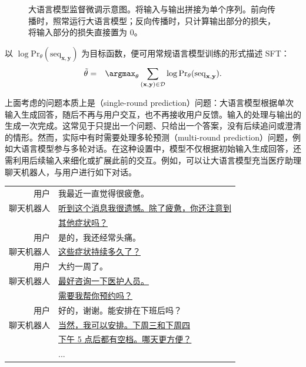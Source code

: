\begin{figure}[!t]
\centering

\caption{大语言模型监督微调示意图。将输入与输出拼接为单个序列。前向传播时，照常运行大语言模型；反向传播时，只计算输出部分的损失，将输入部分的损失直接置为 0。}
\label{fig:sft-forward-backward}
\end{figure}

以 $\log \mathrm{Pr}_{\theta}(\mathrm{seq}_{\mathbf{x},\mathbf{y}})$ 为目标函数，便可用常规语言模型训练的形式描述 SFT：
\begin{eqnarray}
\tilde{\theta} & = & \argmax_{\theta} \sum_{(\mathbf{x},\mathbf{y}) \in \mathcal{D}} \log \mathrm{Pr}_{\theta}(\mathrm{seq}_{\mathbf{x},\mathbf{y}}). \label{eq:sft-single-round-prediction-mle}
\end{eqnarray}

上面考虑的问题本质上是（single-round prediction）问题：大语言模型根据单次输入生成回答，随后不再与用户交互，也不再接收用户反馈。输入的处理与输出的生成一次完成。这常见于只提出一个问题、只给出一个答案，没有后续追问或澄清的情形。然而，实际中有时需要处理多轮预测（multi-round prediction）问题，例如大语言模型参与多轮对话。在这种设置中，模型不仅根据初始输入生成回答，还需利用后续输入来细化或扩展此前的交互。例如，可以让大语言模型充当医疗助理聊天机器人，与用户进行如下对话。

\vspace{0.5em}
\begin{tcolorbox}

\begingroup
\renewcommand{\arraystretch}{1.0}
\setlength{\tabcolsep}{6pt}
\begin{tabular}{r l}
{\color{gray} \small{用户}} & 我最近一直觉得很疲惫。\\  [0.1cm]
{\color{gray} \small{聊天机器人}} & \uline{听到这个消息我很遗憾。除了疲惫，你还注意到} \\
& \uline{其他症状吗？} \\ [0.2cm]
{\color{gray} \small{用户}} & 是的，我还经常头痛。\\  [0.1cm]
{\color{gray} \small{聊天机器人}} & \uline{这些症状持续多久了？} \\ [0.2cm]
{\color{gray} \small{用户}} & 大约一周了。\\  [0.1cm]
{\color{gray} \small{聊天机器人}} & \uline{最好咨询一下医护人员。} \\
& \uline{需要我帮你预约吗？} \\ [0.2cm]
{\color{gray} \small{用户}} & 好的，谢谢。能安排在下班后吗？\\  [0.1cm]
{\color{gray} \small{聊天机器人}} & \uline{当然，我可以安排。下周三和下周四} \\ [0.1cm]
& \uline{下午 5 点后都有空档。哪天更方便？} \\ [0.2cm]
& ...
\end{tabular}
\endgroup

\end{tcolorbox}
\vspace{0.5em}

